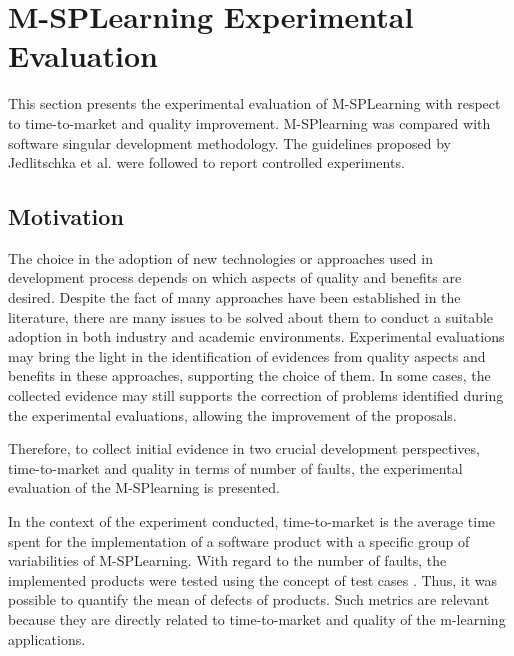 \section{M-SPLearning Experimental Evaluation}\label{section4}


This section presents the experimental evaluation of M-SPLearning with respect to time-to-market and quality improvement. M-SPlearning was compared with software singular development methodology. The guidelines proposed by Jedlitschka et al. \cite{jedlitschka07} were followed to report controlled experiments.

\subsection{Motivation}\label{sub:motivation}


The choice in the adoption of new technologies or approaches used in development process depends on which aspects of quality and benefits are desired. Despite the fact of many approaches have been established in the literature, there are many issues to be solved about them to conduct a suitable adoption in both industry and academic environments. Experimental evaluations may bring the light in the identification of evidences from quality aspects and benefits in these approaches, supporting the choice of them. In some cases, the collected evidence may still supports the correction of problems identified during the experimental evaluations, allowing the improvement of the proposals.

Therefore, to collect initial evidence in two crucial development perspectives, time-to-market and quality in terms of number of faults, the experimental evaluation of the M-SPlearning is presented.

In the context of the experiment conducted, time-to-market is the average time spent for the implementation of a software product with a specific group of variabilities of M-SPLearning. With regard to the number of faults, the implemented products were tested using the concept of test cases \cite{craig02}. Thus, it was possible to quantify the mean of defects of products. Such metrics are relevant because they are directly related to time-to-market and quality of the m-learning applications.




